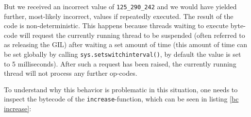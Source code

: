 \documentclass[english,11pt,a4paper,table]{article} %
\begin{document}

But we received an incorrect value of \texttt{125\_290\_242} and we would have yielded further, most-likely incorrect, values if repeatedly executed.
The result of the code is non-deterministic.
This happens because threads waiting to execute byte-code will request the currently running thread to be suspended (often referred to as releasing the GIL) after waiting a set amount of time (this amount of time can be set globally by calling \texttt{sys.setswitchinterval()}, by default the value is set to 5 milliseconds).
After such a request has been raised, the currently running thread will not process any further op-codes.

To understand why this behavior is problematic in this situation, one needs to inspect the bytecode of the \texttt{increase}-function, which can be seen in listing \ref{bc increase}:
\end{document}
